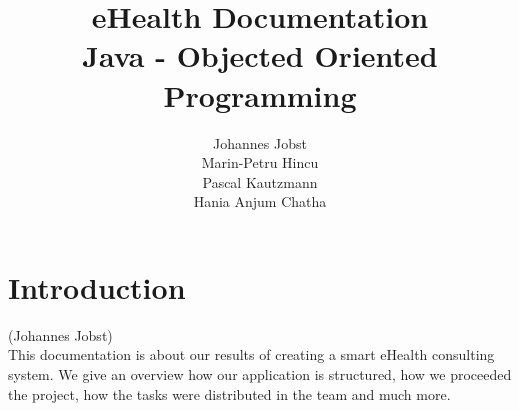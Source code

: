 \documentclass[a4paper, 12pt]{report}
\title{\textbf{eHealth Documentation}\\Java - Objected Oriented Programming}
\author{Johannes Jobst\\Marin-Petru Hincu\\Pascal Kautzmann\\Hania Anjum Chatha}
\begin{document}
\maketitle


\tableofcontents
\listoffigures

\chapter{Introduction}
{\tiny (Johannes Jobst)\\}
This documentation is about our results of creating a smart eHealth consulting system. We give an overview how our application is structured, how we proceeded the project, how the tasks were distributed in the team and much more.
\\
\\
\\
\end{document}
